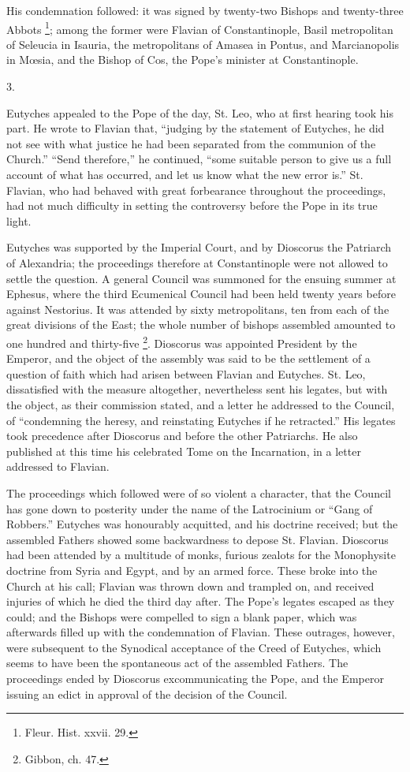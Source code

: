 His condemnation followed: it was signed by twenty-two Bishops and
twenty-three Abbots \footnote{Fleur. Hist. xxvii. 29.};
among the former were Flavian of Constantinople, Basil metropolitan of
Seleucia in Isauria, the metropolitans of Amasea in Pontus, and
Marcianopolis in Mœsia, and the Bishop of Cos, the Pope's minister at
Constantinople.

3.

Eutyches appealed to the Pope of the day, St. Leo, who at first
hearing took his part. He wrote to Flavian that, ``judging by the
statement of Eutyches, he did not see with what justice he had been
separated from the communion of the Church.'' ``Send
therefore,'' he continued, ``some suitable person to give us a
full account of what has occurred, and let us know what the new error
is.'' St. Flavian, who had behaved with great forbearance
throughout the proceedings, had not much difficulty in setting the
controversy before the Pope in its true light.

Eutyches was supported by the Imperial Court, and by Dioscorus the
Patriarch of Alexandria; the proceedings therefore at Constantinople
were not allowed to settle the question. A general Council was
summoned for the ensuing summer at Ephesus, where the third Ecumenical
Council had been held twenty years before against Nestorius. It was
attended by sixty metropolitans, ten from each of the great divisions
of the East; the whole number of bishops assembled amounted to one
hundred and thirty-five \footnote{Gibbon, ch. 47.}.
Dioscorus was appointed President by the Emperor, and the object of
the assembly was said to be the settlement of a question of faith
which had arisen between Flavian and Eutyches. St. Leo, dissatisfied
with the measure altogether, nevertheless sent his legates, but with
the object, as their commission stated, and a letter he addressed to
the Council, of ``condemning the heresy, and reinstating Eutyches
if he retracted.'' His legates took precedence after Dioscorus and
before the other Patriarchs. He also published at this time his
celebrated Tome on the Incarnation, in a letter addressed to Flavian.

The proceedings which followed were of so violent a character, that
the Council has gone down to posterity under the name of the
Latrocinium or ``Gang of Robbers.'' Eutyches was honourably
acquitted, and his doctrine received; but the assembled Fathers showed
some backwardness to depose St. Flavian. Dioscorus had been attended
by a multitude of monks, furious zealots for the Monophysite doctrine
from Syria and Egypt, and by an armed force. These broke into the
Church at his call; Flavian was thrown down and trampled on, and
received injuries of which he died the third day after. The Pope's
legates escaped as they could; and the Bishops were compelled to sign
a blank paper, which was afterwards filled up with the condemnation of
Flavian. These outrages, however, were subsequent to the Synodical
acceptance of the Creed of Eutyches, which seems to have been the
spontaneous act of the assembled Fathers. The proceedings ended by
Dioscorus excommunicating the Pope, and the Emperor issuing an edict
in approval of the decision of the Council.

